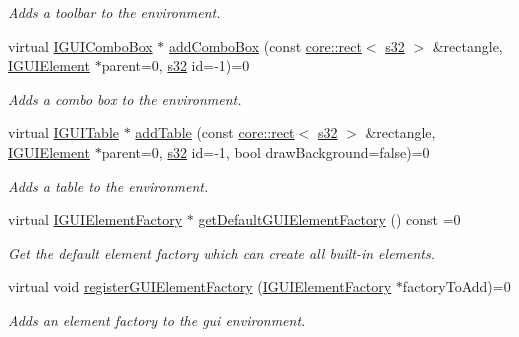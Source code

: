 \begin{DoxyCompactItemize}
\begin{DoxyCompactList}\small\item\em Adds a toolbar to the environment. \end{DoxyCompactList}\item 
virtual \hyperlink{classirr_1_1gui_1_1IGUIComboBox}{I\+G\+U\+I\+Combo\+Box} $\ast$ \hyperlink{classirr_1_1gui_1_1IGUIEnvironment_a24c178560277c21d3d2e3c9ba1196d2f}{add\+Combo\+Box} (const \hyperlink{classirr_1_1core_1_1rect}{core\+::rect}$<$ \hyperlink{namespaceirr_ac66849b7a6ed16e30ebede579f9b47c6}{s32} $>$ \&rectangle, \hyperlink{classirr_1_1gui_1_1IGUIElement}{I\+G\+U\+I\+Element} $\ast$parent=0, \hyperlink{namespaceirr_ac66849b7a6ed16e30ebede579f9b47c6}{s32} id=-\/1)=0
\begin{DoxyCompactList}\small\item\em Adds a combo box to the environment. \end{DoxyCompactList}\item 
virtual \hyperlink{classirr_1_1gui_1_1IGUITable}{I\+G\+U\+I\+Table} $\ast$ \hyperlink{classirr_1_1gui_1_1IGUIEnvironment_a6c4a058d7c6ff21f062b5fe540ca4748}{add\+Table} (const \hyperlink{classirr_1_1core_1_1rect}{core\+::rect}$<$ \hyperlink{namespaceirr_ac66849b7a6ed16e30ebede579f9b47c6}{s32} $>$ \&rectangle, \hyperlink{classirr_1_1gui_1_1IGUIElement}{I\+G\+U\+I\+Element} $\ast$parent=0, \hyperlink{namespaceirr_ac66849b7a6ed16e30ebede579f9b47c6}{s32} id=-\/1, bool draw\+Background=false)=0
\begin{DoxyCompactList}\small\item\em Adds a table to the environment. \end{DoxyCompactList}\item 
virtual \hyperlink{classirr_1_1gui_1_1IGUIElementFactory}{I\+G\+U\+I\+Element\+Factory} $\ast$ \hyperlink{classirr_1_1gui_1_1IGUIEnvironment_a13ec41a31e1b9cdc317c0c6092c2b820}{get\+Default\+G\+U\+I\+Element\+Factory} () const =0
\begin{DoxyCompactList}\small\item\em Get the default element factory which can create all built-\/in elements. \end{DoxyCompactList}\item 
virtual void \hyperlink{classirr_1_1gui_1_1IGUIEnvironment_a653ac2cc8640899c23f4d55d9a5f0fdd}{register\+G\+U\+I\+Element\+Factory} (\hyperlink{classirr_1_1gui_1_1IGUIElementFactory}{I\+G\+U\+I\+Element\+Factory} $\ast$factory\+To\+Add)=0
\begin{DoxyCompactList}\small\item\em Adds an element factory to the gui environment. \end{DoxyCompactList}\item 

\end{DoxyCompactItemize}
